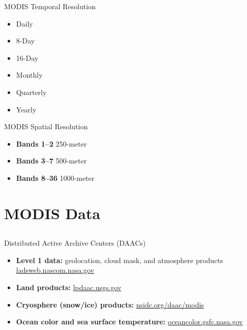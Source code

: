 \documentclass[ignorenonframetext,]{beamer}
\begin{document}
\begin{frame}{MODIS Temporal Resolution}

\begin{itemize}
\itemsep1pt\parskip0pt
\item
  Daily
\item
  8-Day
\item
  16-Day
\item
  Monthly
\item
  Quarterly
\item
  Yearly
\end{itemize}

\end{frame}

\begin{frame}{MODIS Spatial Resolution}

\begin{itemize}
\itemsep1pt\parskip0pt
\item
  \textbf{Bands 1--2} 250-meter
\item
  \textbf{Bands 3--7} 500-meter
\item
  \textbf{Bands 8--36} 1000-meter
\end{itemize}

\end{frame}

\section{MODIS Data}\label{modis-data}

\subsection{}\label{section-3}

\begin{frame}{Distributed Active Archive Centers (DAACs)}

\begin{itemize}
\itemsep1pt\parskip0pt
\item
  \textbf{Level 1 data:} geolocation, cloud mask, and atmosphere
  products
  \href{http://ladsweb.nascom.nasa.gov/}{ladsweb.nascom.nasa.gov}
\item
  \textbf{Land products:}
  \href{https://lpdaac.usgs.gov/}{lpdaac.usgs.gov}
\item
  \textbf{Cryosphere (snow/ice) products:}
  \href{http://nsidc.org/daac/modis/index.html}{nsidc.org/daac/modis}
\item
  \textbf{Ocean color and sea surface temperature:}
  \href{http://oceancolor.gsfc.nasa.gov/}{oceancolor.gsfc.nasa.gov}
\end{itemize}

\end{frame}
\end{document}
